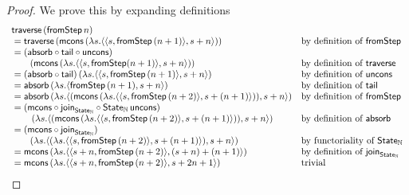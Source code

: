 \begin{proof}
We prove this by expanding definitions
$$
\begin{array}{ll}
\mathsf{traverse}\, (\mathsf{fromStep}\, n) \\
{}= \mathsf{traverse}\, (\mathsf{mcons}\, (\lambda s. \langle \langle s, \mathsf{fromStep}\, (n + 1) \rangle, s + n \rangle))
	& \mbox{by definition of }\mathsf{fromStep} \\
{}= (\mathsf{absorb} \circ \mathsf{tail} \circ \mathsf{uncons})\, \\\qquad (\mathsf{mcons}\, (\lambda s. \langle \langle s, \mathsf{fromStep} (n + 1) \rangle, s + n \rangle))
	& \mbox{by definition of }\mathsf{traverse} \\
{}= (\mathsf{absorb} \circ \mathsf{tail})\, (\lambda s. \langle \langle s, \mathsf{fromStep}\, (n + 1) \rangle, s + n \rangle)
	& \mbox{by definition of }\mathsf{uncons} \\
{}= \mathsf{absorb}\, (\lambda s. \langle \mathsf{fromStep}\, (n + 1), s + n \rangle)
	& \mbox{by definition of }\mathsf{tail} \\
{}= \mathsf{absorb}\, (\lambda s. \langle (\mathsf{mcons}\, (\lambda s. \langle \langle s, \mathsf{fromStep}\, (n + 2) \rangle, s + (n + 1) \rangle)), s + n \rangle)
	& \mbox{by definition of }\mathsf{fromStep} \\
{}= (\mathsf{mcons} \circ \mathsf{join}_{\mathsf{State}_{\mathbb{N}}} \circ \mathsf{State}_{\mathbb{N}}\,\mathsf{uncons}) \\\qquad \, (\lambda s. \langle (\mathsf{mcons}\, (\lambda s. \langle \langle s, \mathsf{fromStep}\, (n + 2) \rangle, s + (n + 1) \rangle)), s + n \rangle)
	& \mbox{by definition of }\mathsf{absorb} \\
{}= (\mathsf{mcons} \circ \mathsf{join}_{\mathsf{State}_{\mathbb{N}}})\, \\\qquad (\lambda s. \langle (\lambda s. \langle \langle s, \mathsf{fromStep}\, (n + 2) \rangle, s + (n + 1) \rangle), s + n \rangle)
	& \mbox{by functoriality of }\mathsf{State}_{\mathbb{N}} \\
{}= \mathsf{mcons}\, (\lambda s. \langle \langle s + n, \mathsf{fromStep}\,(n + 2) \rangle, (s + n) + (n + 1) \rangle)
	& \mbox{by definition of } \mathsf{join}_{\mathsf{State}_{\mathbb{N}}} \\
{}= \mathsf{mcons}\, (\lambda s. \langle \langle s + n, \mathsf{fromStep}\,(n + 2) \rangle, s + 2n + 1 \rangle)
	& \mbox{trivial} \\
\end{array}
$$
\end{proof}

